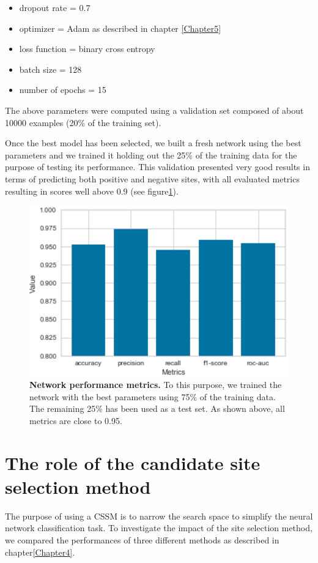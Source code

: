 \begin{itemize}
	\item dropout rate = 0.7
	\item optimizer = Adam as described in chapter \ref{Chapter5}
	\item loss function = binary cross entropy
	\item batch size = 128
	\item number of epochs = 15
\end{itemize}

The above parameters were computed using a validation set composed of about 10000 examples (20\% of the training set).

Once the best model has been selected, we built a fresh network using the best parameters and we trained it holding out the 25\% of the training data for the purpose of testing its performance. This validation presented very good results in terms of predicting both positive and negative sites, with all evaluated metrics resulting in scores well above 0.9 (see figure\ref{fig:network_evaluation}).

\begin{figure}[hbt!]
	\centering
	\includegraphics[width=\textwidth]{Figures/network_evaluation}
	\caption{\textbf{Network performance metrics.} To this purpose, we trained the network with the best parameters using 75\% of the training data. The remaining 25\% has been used as a test set. As shown above, all metrics are close to 0.95.}
	\label{fig:network_evaluation}
\end{figure}

\section{The role of the candidate site selection method}
The purpose of using a CSSM is to narrow the search space to simplify the neural network classification task. To investigate the impact of the site selection method, we compared the performances of three different methods as described in chapter\ref{Chapter4}. 

